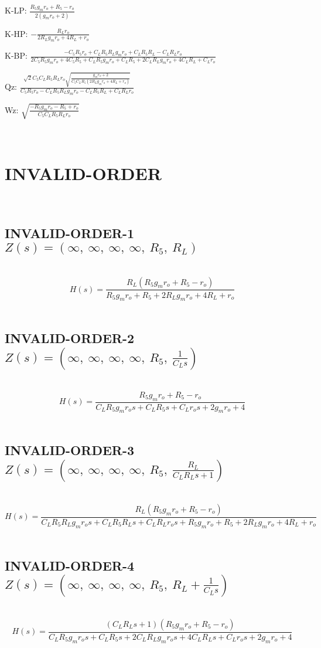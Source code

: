 \documentclass{article}
\begin{document}
K-LP: $\frac{R_{5} g_{m} r_{o} + R_{5} - r_{o}}{2 \left(g_{m} r_{o} + 2\right)}$\ 

K-HP: $- \frac{R_{L} r_{o}}{2 R_{L} g_{m} r_{o} + 4 R_{L} + r_{o}}$\ 

K-BP: $\frac{- C_{5} R_{5} r_{o} + C_{L} R_{5} R_{L} g_{m} r_{o} + C_{L} R_{5} R_{L} - C_{L} R_{L} r_{o}}{2 C_{5} R_{5} g_{m} r_{o} + 4 C_{5} R_{5} + C_{L} R_{5} g_{m} r_{o} + C_{L} R_{5} + 2 C_{L} R_{L} g_{m} r_{o} + 4 C_{L} R_{L} + C_{L} r_{o}}$\ 

Qz: $\frac{\sqrt{2} C_{5} C_{L} R_{5} R_{L} r_{o} \sqrt{\frac{g_{m} r_{o} + 2}{C_{5} C_{L} R_{5} \left(2 R_{L} g_{m} r_{o} + 4 R_{L} + r_{o}\right)}}}{C_{5} R_{5} r_{o} - C_{L} R_{5} R_{L} g_{m} r_{o} - C_{L} R_{5} R_{L} + C_{L} R_{L} r_{o}}$\ 

Wz: $\sqrt{\frac{- R_{5} g_{m} r_{o} - R_{5} + r_{o}}{C_{5} C_{L} R_{5} R_{L} r_{o}}}$\ 

\ 

\section{INVALID-ORDER}\ 
\subsection{INVALID-ORDER-1 $Z(s) = \left( \infty, \  \infty, \  \infty, \  \infty, \  R_{5}, \  R_{L}\right)$ } \ 
\textbf{\[H(s) = \frac{R_{L} \left(R_{5} g_{m} r_{o} + R_{5} - r_{o}\right)}{R_{5} g_{m} r_{o} + R_{5} + 2 R_{L} g_{m} r_{o} + 4 R_{L} + r_{o}}\] } \ 
\subsection{INVALID-ORDER-2 $Z(s) = \left( \infty, \  \infty, \  \infty, \  \infty, \  R_{5}, \  \frac{1}{C_{L} s}\right)$ } \ 
\textbf{\[H(s) = \frac{R_{5} g_{m} r_{o} + R_{5} - r_{o}}{C_{L} R_{5} g_{m} r_{o} s + C_{L} R_{5} s + C_{L} r_{o} s + 2 g_{m} r_{o} + 4}\] } \ 
\subsection{INVALID-ORDER-3 $Z(s) = \left( \infty, \  \infty, \  \infty, \  \infty, \  R_{5}, \  \frac{R_{L}}{C_{L} R_{L} s + 1}\right)$ } \ 
\textbf{\[H(s) = \frac{R_{L} \left(R_{5} g_{m} r_{o} + R_{5} - r_{o}\right)}{C_{L} R_{5} R_{L} g_{m} r_{o} s + C_{L} R_{5} R_{L} s + C_{L} R_{L} r_{o} s + R_{5} g_{m} r_{o} + R_{5} + 2 R_{L} g_{m} r_{o} + 4 R_{L} + r_{o}}\] } \ 
\subsection{INVALID-ORDER-4 $Z(s) = \left( \infty, \  \infty, \  \infty, \  \infty, \  R_{5}, \  R_{L} + \frac{1}{C_{L} s}\right)$ } \ 
\textbf{\[H(s) = \frac{\left(C_{L} R_{L} s + 1\right) \left(R_{5} g_{m} r_{o} + R_{5} - r_{o}\right)}{C_{L} R_{5} g_{m} r_{o} s + C_{L} R_{5} s + 2 C_{L} R_{L} g_{m} r_{o} s + 4 C_{L} R_{L} s + C_{L} r_{o} s + 2 g_{m} r_{o} + 4}\] } \ 
\end{document}
